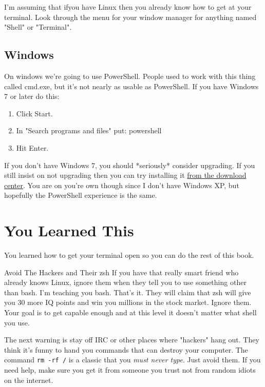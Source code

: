I'm assuming that ifyou have Linux then you already know how to get at your terminal.  Look through the
menu for your window manager for anything named "Shell" or "Terminal".

\subsection{Windows}

On windows we're going to use PowerShell. People used to work with this thing called cmd.exe, but it's not nearly as usable as PowerShell. If you have Windows 7 or later do this:

\begin{enumerate}
\item Click Start.
\item In "Search programs and files" put: powershell
\item Hit Enter.
\end{enumerate}

If you don't have Windows 7, you should *seriously* consider upgrading. If you
still insist on not upgrading then you can try installing it
\href{http://www.microsoft.com/download/en/details.aspx?displaylang=en&id=16818}{from
the download center}. You are on you're own though since I don't have Windows
XP, but hopefully the PowerShell experience is the same. 

\section{You Learned This}

You learned how to get your terminal open so you can do the rest of this book.

\begin{aside}{Avoid The Hackers and Their zsh}
If you have that really smart friend who already knows Linux, ignore them when they tell you to use something
other than bash.  I'm teaching you bash.  That's it.  They will claim that zsh will give you 30 more IQ points
and win you millions in the stock market.  Ignore them.  Your goal is to get capable enough and at this level
it doesn't matter what shell you use.

The next warning is stay off IRC or other places where "hackers" hang out.  They think it's funny to hand you
commands that can destroy your computer.  The command \verb|rm -rf /| is a classic that you \emph{must never type}.
Just avoid them.  If you need help, make sure you get it from someone you trust not from random idiots on the
internet.
\end{aside}

